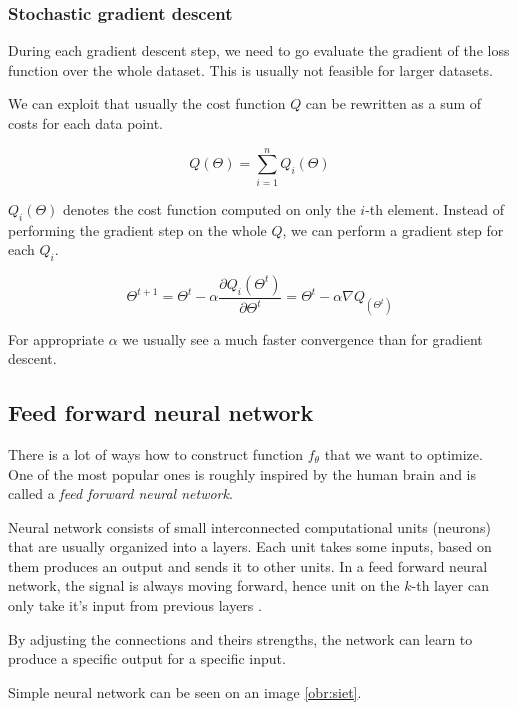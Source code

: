     
    \subsubsection{Stochastic gradient descent}
    
    During each gradient descent step, we need to go evaluate the gradient of the loss function over the whole dataset.
    This is usually not feasible for larger datasets. 
    
    We can exploit that usually the cost function $Q$ can be rewritten as a sum of costs for each data point.
    
    $$Q(\Theta) = \sum_{i=1}^n Q_i(\Theta)$$
    
    $Q_i(\Theta)$ denotes the cost function computed on only the $i$-th element. 
    Instead of performing the gradient step on the whole $Q$, 
    we can perform a gradient step for each $Q_i$. 

    $$\Theta^{t+1} = \Theta^t - \alpha \frac{\partial Q_i(\Theta^t)}{\partial \Theta^t} = \Theta^t - \alpha \nabla Q_(\Theta^t)$$
    
    For appropriate $\alpha$ we usually see a much faster convergence than for gradient descent.
    
    
    \subsection{Feed forward neural network}
    There is a lot of ways how to construct function $f_\theta$ that we want to optimize. 
    One of the most popular ones is roughly inspired by the human brain and is called a \textit{feed forward neural network}.
    
    Neural network consists of small interconnected computational units (neurons) that are usually organized into a layers.
    Each unit takes some inputs, based on them produces an output and sends it to other units. 
    In a feed forward neural network, the signal is always moving forward,
    hence unit on the $k$-th layer can only take it's input from previous layers \cite{Goodfellow-et-al-2016}.
    
    By adjusting the connections and theirs strengths, the network can learn to produce a specific output for a specific input.
    
    Simple neural network can be seen on an image \ref{obr:siet}.
    
